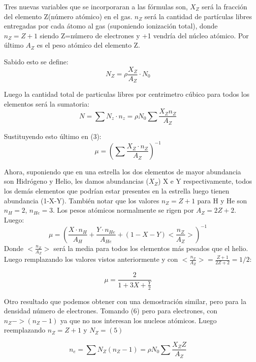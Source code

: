 \documentclass[2pt]{article}
\begin{document}
Tres nuevas variables que se incorporaran a las fórmulas son, $X_Z$ será la fracción del elemento Z(número atómico) en el gas. $n_Z$ será la cantidad de partículas libres entregadas por cada átomo al gas (suponiendo ionización total), donde $n_Z=Z+1$ siendo Z=número de electrones y +1 vendría del núcleo atómico. Por último $A_Z$ es el peso atómico del elemento Z.

Sabido esto se define:
\begin{equation}
N_Z=\rho\frac{X_Z}{A_Z}\cdot N_0
\end{equation}

Luego la cantidad total de particulas libres por centrimetro cúbico para todos los elementos será la sumatoria:
\begin{equation}
N=\sum N_z\cdot n_z =\rho N_0  \sum \frac{X_Z n_Z}{A_Z}
\end{equation}

Sustituyendo esto último en (3):
\begin{equation}
\mu=(\sum \frac{X_Z\cdot n_Z}{A_Z})^{-1}
\end{equation}

Ahora, suponiendo que en una estrella los dos elementos de mayor abundancia son Hidrógeno y Helio, les damos abundancias ($X_Z$) X e Y respectivamente, todos los demás elementos que podrían estar presentes en la estrella luego tienen abundancia (1-X-Y). También notar que los valores $n_Z=Z+1$ para H y He son $n_H=2$, $n_{He}=3$. Los pesos atómicos normalmente se rigen por $A_Z=2Z+2$.
Luego:
\begin{equation}
\mu=(\frac{X\cdot n_H}{A_H} + \frac{Y\cdot n_{He}}{A_{He}}+ (1-X-Y)<\frac{n_Z}{A_Z}>)^{-1}
\end{equation}
Donde $<\frac{n_Z}{A_Z}>$ será la media para todos los elementos más pesados que el helio.
Luego remplazando los valores vistos anteriormente y con $<\frac{n_Z}{A_Z}>=\frac{Z+1}{2Z+2}=1/2$:

\begin{equation}
\mu= \frac{2}{1+3X+\frac{Y}{2}}
\end{equation}


Otro resultado que podemos obtener con una demostración similar, pero para la densidad número de electrones. Tomando (6) pero para electrones, con $n_Z->(n_Z-1)$ ya que no nos interesan los nucleos atómicos. Luego reemplazando $n_Z=Z+1$ y $N_Z=(5)$

\begin{equation}
n_e=\sum N_Z(n_Z-1)=\rho N_0 \sum \frac{X_Z Z}{A_Z}
\end{equation}
\end{document}
